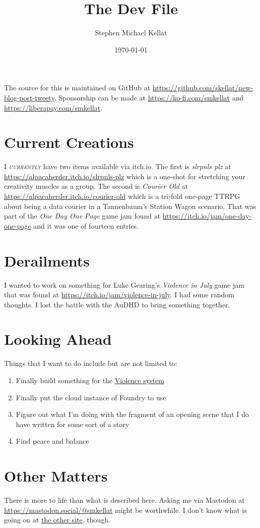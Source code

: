\documentclass{article}
\title{The Dev File}
\author{Stephen Michael Kellat}
\date{\today}
\begin{document}
\maketitle
The source for this is maintained on GitHub at \url{https://github.com/skellat/new-blog-post-tweety}.  Sponsorship can be made at \url{https://ko-fi.com/smkellat} and \url{https://liberapay.com/smkellat}.

\section{Current Creations}

I \textsc{\emph{currently}} have two items available via itch.io.  The first is \emph{slrpnls plz} at \url{https://alpacaherder.itch.io/slrpnls-plz} which is a one-shot for stretching your creativity muscles as a group.  The second is \emph{Courier Old} at \url{https://alpacaherder.itch.io/courier-old} which is a tri-fold one-page TTRPG about being a data courier in a Tannenbaum's Station Wagon scenario.  That was part of the \emph{One Day One Page} game jam found at \url{https://itch.io/jam/one-day-one-page} and it was one of fourteen entries.

\section{Derailments}

I wanted to work on something for Luke Gearing's \emph{Violence in July} game jam that was found at \url{https://itch.io/jam/violence-in-july}.  I had some random thoughts.  I lost the battle with the AuDHD to bring something together.

\section{Looking Ahead}

Things that I want to do include but are not limited to:
\begin{enumerate}
    \item Finally build something for the \href{https://lukegearing.blot.im/violence}{Violence system}
    \item Finally put the cloud instance of Foundry to use
    \item Figure out what I'm doing with the fragment of an opening scene that I do have written for some sort of a story
    \item Find peace and balance
\end{enumerate}

\section{Other Matters}

There is more to life than what is described here.  Asking me via Mastodon at \url{https://mastodon.social/@smkellat} might be worthwhile.  I don't know what is going on at \href{https://wargame.blog}{the other site}, though.
\end{document}
